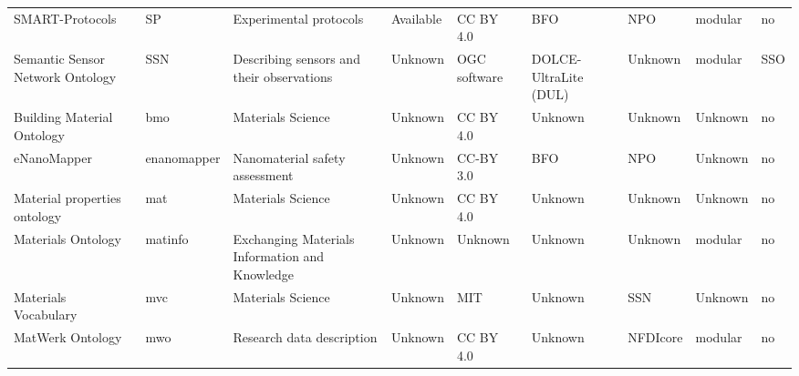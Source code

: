 \begin{table}
\begin{tabular}{m{5cm}m{2cm}m{5cm}m{2cm}m{2cm}m{2cm}m{2cm}m{2cm}m{2cm}}
                                               SMART-Protocols &                      SP &                                                            Experimental protocols &            Available &    CC BY 4.0 &                          BFO &               NPO &    modular &               no \\
                             Semantic Sensor Network Ontology &                     SSN &                                         Describing sensors and their observations &              Unknown & OGC software &        DOLCE-UltraLite (DUL) &           Unknown &    modular &              SSO \\
                                                       Building Material Ontology &                     bmo &                                                                 Materials Science &              Unknown &    CC BY 4.0 &                      Unknown &           Unknown &    Unknown &               no \\
                                                   eNanoMapper &             enanomapper &                                                    Nanomaterial safety assessment &              Unknown &    CC-BY 3.0 &                          BFO &               NPO &    Unknown &               no \\
                                                     Material properties ontology &                     mat &                                                                 Materials Science &              Unknown &    CC BY 4.0 &                      Unknown &           Unknown &    Unknown &               no \\
                                                Materials Ontology &                 matinfo &                                    Exchanging Materials Information and Knowledge &              Unknown &      Unknown &                      Unknown &           Unknown &    modular &               no \\
                                                             Materials Vocabulary &                     mvc &                                                                 Materials Science &              Unknown &         MIT  &                      Unknown &               SSN &    Unknown &               no \\
                                                                 MatWerk Ontology &                     mwo &                                                         Research data description &              Unknown &    CC BY 4.0 &                      Unknown &          NFDIcore &    modular &               no \\

\end{tabular}
\end{table}
